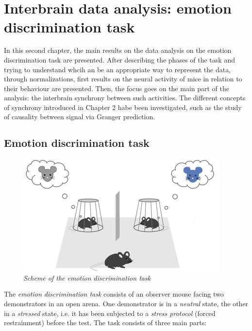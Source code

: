 \documentclass[a4paper]{article}
\begin{document}
	
	
	
\section{Interbrain data analysis: emotion discrimination task}

In this second chapter, the main results on the data analysis on the emotion discrimination task are presented. After describing the phases of the task and trying to understand whcih an be an appropriate way  to represent the data, through normalizations, first results on the neural activity of mice in relation to their behaviour are presented. Then, the focus goes on the main part of the analysis: the interbrain synchrony between such activities. The different concepts of synchrony introduced in Chapter 2 habe been investigated, such as the study of causality between signal via Granger prediction. 


\subsection{Emotion discrimination task}

\begin{figure}[H]
	\begin{center}
		\includegraphics[scale=.90]{emotion_discrimination.png} 
	\end{center} 
	\caption{\textit{Scheme of the emotion discrimination task}}
	
\end{figure}

The \textit{emotion discrimination task} consists of an observer mouse facing two demonstrators in an open arena. One demonstrator is in a \textit{neutral} state, the other in a \textit{stressed} state, i.e. it has been subjected to a \textit{stress protocol} (forced restrainment) before the test. The task consists of three main parts:
\end{document}
